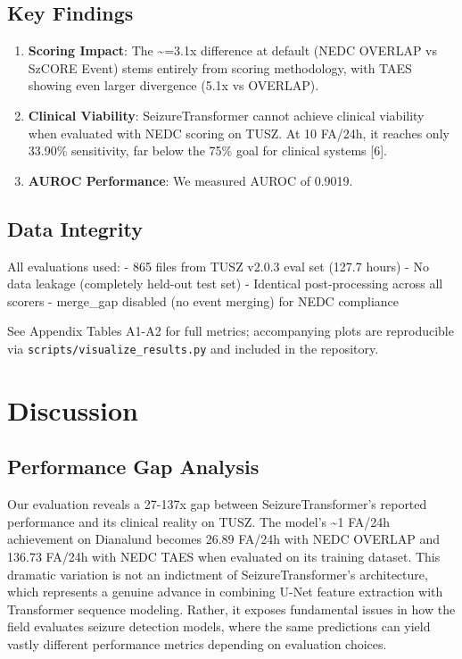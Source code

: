 \documentclass[
]{article}
\begin{document}
\hypertarget{key-findings}{%
\subsection{Key Findings}\label{key-findings}}

\begin{enumerate}
\def\labelenumi{\arabic{enumi}.}
\item
  \textbf{Scoring Impact}: The \textasciitilde=3.1x difference at
  default (NEDC OVERLAP vs SzCORE Event) stems entirely from scoring
  methodology, with TAES showing even larger divergence (5.1x vs
  OVERLAP).
\item
  \textbf{Clinical Viability}: SeizureTransformer cannot achieve
  clinical viability when evaluated with NEDC scoring on TUSZ. At 10
  FA/24h, it reaches only 33.90\% sensitivity, far below the 75\% goal
  for clinical systems {[}6{]}.
\item
  \textbf{AUROC Performance}: We measured AUROC of 0.9019.
\end{enumerate}

\hypertarget{data-integrity}{%
\subsection{Data Integrity}\label{data-integrity}}

All evaluations used: - 865 files from TUSZ v2.0.3 eval set (127.7
hours) - No data leakage (completely held-out test set) - Identical
post-processing across all scorers - merge\_gap disabled (no event
merging) for NEDC compliance

See Appendix Tables A1-A2 for full metrics; accompanying plots are
reproducible via \texttt{scripts/visualize\_results.py} and included in
the repository.

\hypertarget{discussion}{%
\section{Discussion}\label{discussion}}

\hypertarget{performance-gap-analysis}{%
\subsection{Performance Gap Analysis}\label{performance-gap-analysis}}

Our evaluation reveals a 27-137x gap between SeizureTransformer's
reported performance and its clinical reality on TUSZ. The model's
\textasciitilde1 FA/24h achievement on Dianalund becomes 26.89 FA/24h
with NEDC OVERLAP and 136.73 FA/24h with NEDC TAES when evaluated on its
training dataset. This dramatic variation is not an indictment of
SeizureTransformer's architecture, which represents a genuine advance in
combining U-Net feature extraction with Transformer sequence modeling.
Rather, it exposes fundamental issues in how the field evaluates seizure
detection models, where the same predictions can yield vastly different
performance metrics depending on evaluation choices.
\end{document}
